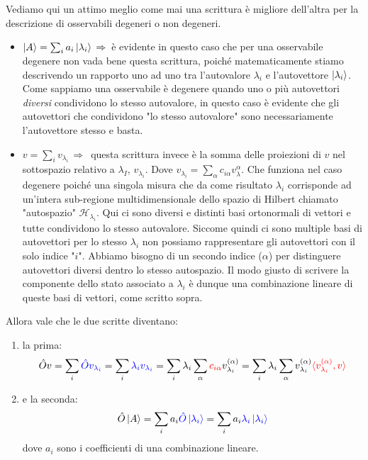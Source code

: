 \begin{myapprf}
	Vediamo qui un attimo meglio come mai una scrittura è migliore dell'altra per la descrizione di osservabili degeneri o non degeneri.
\begin{itemize}
	\item $\ket{A} = \sum_i a_i \ket{\lambda_i} \, \Rightarrow \, $ è evidente in questo caso che per una osservabile degenere non vada bene questa scrittura, poiché matematicamente stiamo descrivendo un rapporto uno ad uno tra l'autovalore $\lambda_i$ e l'autovettore $\ket{\lambda_i}$. Come sappiamo una osservabile è degenere quando uno o più autovettori \textit{diversi} condividono lo stesso autovalore, in questo caso è evidente che gli autovettori che condividono "lo stesso autovalore" sono necessariamente l'autovettore stesso e basta.
	
	\item $v = \sum_i v_{\lambda_i} \, \Rightarrow \, $ questa scrittura invece è la somma delle proiezioni di $v$ nel sottospazio relativo a $\lambda_I$, $v_{\lambda_i}$. Dove $v_{\lambda_i} = \sum_{\alpha} c_{i\alpha} v_{\lambda}^{\alpha}$. Che funziona nel caso degenere poiché una singola misura che da come risultato $\lambda_i$ corrisponde ad un'intera sub-regione multidimensionale dello spazio di Hilbert chiamato "autospazio" $\mathcal{H}_{\lambda_i}$. Qui ci sono diversi e distinti basi ortonormali di vettori e tutte condividono lo stesso autovalore. Siccome quindi ci sono multiple basi di autovettori per lo stesso $\lambda_i$ non possiamo rappresentare gli autovettori con il solo indice "$i$". Abbiamo bisogno di un secondo indice ($\alpha$) per distinguere autovettori diversi dentro lo stesso autospazio. Il modo giusto di scrivere la componente dello stato associato a $\lambda_i$ è dunque una combinazione lineare di queste basi di vettori, come scritto sopra.
\end{itemize}
\end{myapprf}	
	
	Allora vale che le due scritte diventano:

\begin{enumerate}

	\item la prima:
	\begin{align*}
		\hat{O}v = \sum_i \textcolor{blue}{\hat{O} v_{\lambda_i}} = \sum_i \textcolor{blue}{\lambda_i v_{\lambda_i}} = \sum_i \lambda_i \sum_{\alpha} \textcolor{red}{c_{i\alpha}} v_{\lambda_i}^{\qty(\alpha)} = \sum_i \lambda_i \sum_{\alpha} v_{\lambda_i}^{\qty(\alpha)} \textcolor{red}{\langle  v_{\lambda_i}^{\qty(\alpha)}, v   \rangle}
	\end{align*}

	\item e la seconda:
	\begin{align*}
		\hat{O}\ket{A} = \sum_i a_i \textcolor{blue}{\hat{O} \ket{\lambda_i}} = \sum_i a_i \textcolor{blue}{\lambda_i \ket{\lambda_i}}
	\end{align*}
		dove $a_i$ sono i coefficienti di una combinazione lineare.
	
\end{enumerate}

